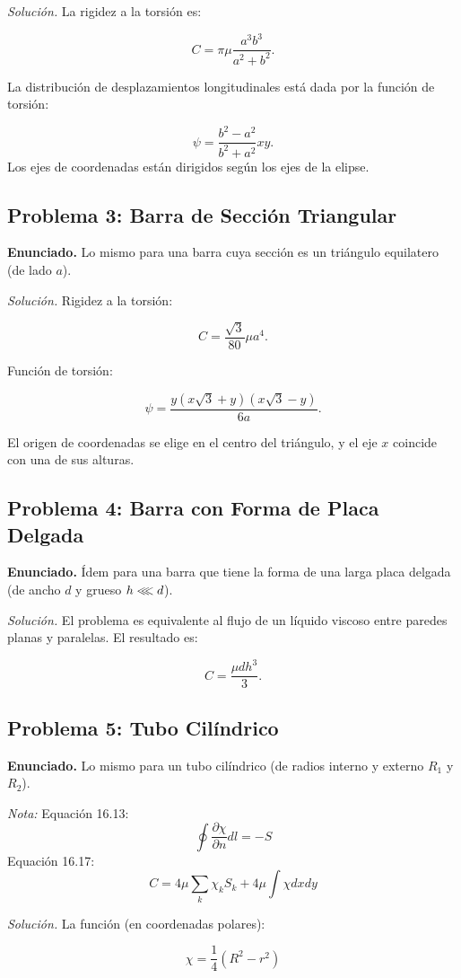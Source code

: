 \documentclass{article}
\begin{document}
\textit{Solución.} La rigidez a la torsión es:

$$
C = \pi \mu \frac{a^3 b^3}{a^2 + b^2}.
$$

La distribución de desplazamientos longitudinales está dada por la función de torsión:

$$
\psi = \frac{b^2 - a^2}{b^2 + a^2} xy.
$$
Los ejes de coordenadas están dirigidos según los ejes de la elipse.

\subsection*{Problema 3: Barra de Sección Triangular}
\textbf{Enunciado.} Lo mismo para una barra cuya sección es un triángulo equilatero (de lado $a$).

\textit{Solución.} Rigidez a la torsión:

$$
C = \frac{\sqrt{3}}{80} \mu a^4.
$$

Función de torsión:

$$
\psi = \frac{y(x\sqrt{3} + y)(x\sqrt{3} - y)}{6a}.
$$

El origen de coordenadas se elige en el centro del triángulo, y el eje $x$ coincide con una de sus alturas.

\subsection*{Problema 4: Barra con Forma de Placa Delgada}
\textbf{Enunciado.} Ídem para una barra que tiene la forma de una larga placa delgada (de ancho $d$ y grueso $h\llless d$).

\textit{Solución.} El problema es equivalente al flujo de un líquido viscoso entre paredes planas y paralelas. El resultado es:

$$
C = \frac{\mu dh^3}{3}.
$$

\subsection*{Problema 5: Tubo Cilíndrico}
\textbf{Enunciado.} Lo mismo para un tubo cilíndrico (de radios interno y externo $R_1$ y $R_2$).

\textit{Nota:} Equación 16.13: $$ \oint \frac{\partial \chi}{\partial n}dl=-S $$
Equación 16.17: $$ C=4\mu \sum_{k}\chi_k S_k +4\mu \int \chi dx dy $$

\textit{Solución.} La función (en coordenadas polares):

$$
\chi = \frac{1}{4}(R^2 - r^2)
$$
\end{document}
